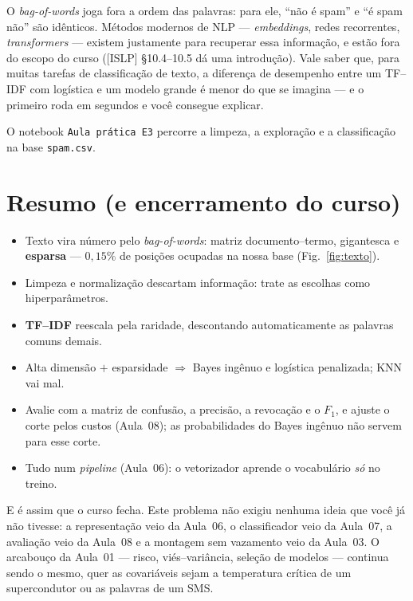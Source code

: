 \documentclass[11pt,a4paper]{article}
\begin{document}
\begin{observacao}
O \emph{bag-of-words} joga fora a ordem das palavras: para ele, ``não é spam'' e
``é spam não'' são idênticos. Métodos modernos de NLP --- \emph{embeddings},
redes recorrentes, \emph{transformers} --- existem justamente para recuperar essa
informação, e estão fora do escopo do curso ([ISLP] §10.4--10.5 dá uma introdução).
Vale saber que, para muitas tarefas de classificação de texto, a diferença de
desempenho entre um TF--IDF com logística e um modelo grande é menor do que se
imagina --- e o primeiro roda em segundos e você consegue explicar.
\end{observacao}

O notebook \texttt{Aula prática E3} percorre a limpeza, a exploração
e a classificação na base \texttt{spam.csv}.

\section*{Resumo (e encerramento do curso)}
\begin{itemize}[leftmargin=1.4cm]
  \item Texto vira número pelo \emph{bag-of-words}: matriz documento--termo,
        gigantesca e \textbf{esparsa} --- $0{,}15\%$ de posições ocupadas na nossa
        base (Fig.~\ref{fig:texto}).
  \item Limpeza e normalização descartam informação: trate as escolhas como
        hiperparâmetros.
  \item \textbf{TF--IDF} reescala pela raridade, descontando automaticamente as
        palavras comuns demais.
  \item Alta dimensão $+$ esparsidade $\Rightarrow$ Bayes ingênuo e logística
        penalizada; KNN vai mal.
  \item Avalie com a matriz de confusão, a precisão, a revocação e o $F_1$, e ajuste
        o corte pelos custos (Aula~08); as probabilidades do Bayes ingênuo não servem
        para esse corte.
  \item Tudo num \emph{pipeline} (Aula~06): o vetorizador aprende o vocabulário
        \emph{só} no treino.
\end{itemize}

\noindent
E é assim que o curso fecha. Este problema não exigiu nenhuma ideia que você já não
tivesse: a representação veio da Aula~06, o classificador veio da Aula~07, a avaliação veio da Aula~08 e a montagem
sem vazamento veio da Aula~03. O arcabouço da Aula~01 --- risco, viés--variância,
seleção de modelos --- continua sendo o mesmo, quer as covariáveis sejam a
temperatura crítica de um supercondutor ou as palavras de um SMS.
\end{document}
